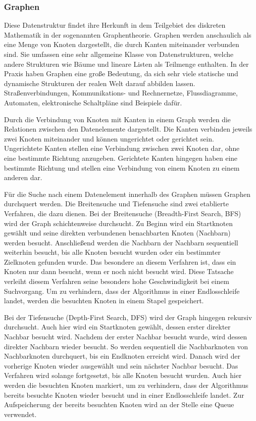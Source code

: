 \subsubsection{Graphen}
Diese Datenstruktur findet ihre Herkunft in dem Teilgebiet des diskreten Mathematik in der sogenannten Graphentheorie. Graphen werden anschaulich als eine Menge von Knoten dargestellt, die durch Kanten miteinander verbunden sind. Sie umfassen eine sehr allgemeine Klasse von Datenstrukturen, welche andere Strukturen wie Bäume und lineare Listen als Teilmenge enthalten. In der Praxis haben Graphen eine große Bedeutung, da sich sehr viele statische und dynamische Strukturen der realen Welt darauf abbilden lassen. Straßenverbindungen, Kommunikations- und Rechnernetze, Flussdiagramme, Automaten, elektronische Schaltpläne sind Beispiele dafür. \autocite[215]{knebl_algorithmen_2021} \autocite[654]{ernst_grundkurs_2020}

Durch die Verbindung von Knoten mit Kanten in einem Graph werden die Relationen zwischen den Datenelemente dargestellt. Die Kanten verbinden jeweils zwei Knoten miteinander und können ungerichtet oder gerichtet sein. Ungerichtete Kanten stellen eine Verbindung zwischen zwei Knoten dar, ohne eine bestimmte Richtung anzugeben. Gerichtete Kanten hingegen haben eine bestimmte Richtung und stellen eine Verbindung von einem Knoten zu einem anderen dar. \autocite[221-222]{knebl_algorithmen_2021}

Für die Suche nach einem Datenelement innerhalb des Graphen müssen Graphen durchquert werden. Die Breitensuche und Tiefensuche sind zwei etablierte Verfahren, die dazu dienen. Bei der Breitensuche (Breadth-First Search, BFS) wird der Graph schichtenweise durchsucht. Zu Beginn wird ein Startknoten gewählt und seine direkten verbundenen benachbarten Knoten (Nachbarn) werden besucht. Anschließend werden die Nachbarn der Nachbarn sequentiell weiterhin besucht, bis alle Knoten besucht wurden oder ein bestimmter Zielknoten gefunden wurde. Das besondere an diesem Verfahren ist, dass ein Knoten nur dann besucht, wenn er noch nicht besucht wird. Diese Tatsache verleiht diesem Verfahren seine besonders hohe Geschwindigkeit bei einem Suchvorgang. Um zu verhindern, dass der Algorithmus in einer Endlosschleife landet, werden die besuchten Knoten in einem Stapel gespeichert. \autocite[227-228]{knebl_algorithmen_2021} \autocite[666]{ernst_grundkurs_2020}

Bei der Tiefensuche (Depth-First Search, DFS) wird der Graph hingegen rekursiv durchsucht. Auch hier wird ein Startknoten gewählt, dessen erster direkter Nachbar besucht wird. Nachdem der erster Nachbar besucht wurde, wird dessen direkter Nachbarn wieder besucht. So werden sequentiell die Nachbarknoten von Nachbarknoten durchquert, bis ein Endknoten erreicht wird. Danach wird der vorherige Knoten wieder ausgewählt und sein nächster Nachbar besucht. Das Verfahren wird solange fortgesetzt, bis alle Knoten besucht wurden. Auch hier werden die besuchten Knoten markiert, um zu verhindern, dass der Algorithmus bereits besuchte Knoten wieder besucht und in einer Endlosschleife landet. Zur Aufspeicherung der bereits besuchten Knoten wird an der Stelle eine Queue verwendet. \autocite[231-232]{knebl_algorithmen_2021} \autocite[666]{ernst_grundkurs_2020}

